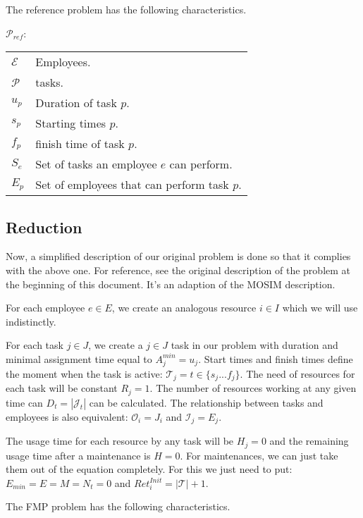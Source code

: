 \documentclass[a4paper,11pt]{article}
\begin{document}
    The reference problem has the following characteristics.

    $\mathcal{P}_{ref}$:

    \begin{tabular}{ll}
        $\mathcal{E}$       & Employees. \\
        $\mathcal{P}$       & tasks.  \\
        $u_p$     			&  Duration of task $p$. \\
        $s_p$     			&  Starting times $p$. \\
        $f_p$     			&  finish time of task $p$. \\
        $S_e$     &  Set of tasks an employee $e$ can perform. \\
        $E_p$ &  Set of employees that can perform task $p$. \\
    \end{tabular}

    \subsection{Reduction}

    Now, a simplified description of our original problem is done so that it complies with the above one. For reference, see the original description of the problem at the beginning of this document. It's an adaption of the MOSIM description.

    For each employee $e \in E$, we create an analogous resource $i \in I$ which we will use indistinctly. 

    For each task $j \in J$, we create a $j \in J$ task in our problem with duration and minimal assignment time equal to $A^{min}_j = u_j$. Start times and finish times define the moment when the task is active: $\mathcal{T}_j = t \in \{s_j ... f_j\}$. The need of resources for each task will be constant $R_{j} = 1$. The number of resources working at any given time can $D_t = |\mathcal{J}_t|$ can be calculated. The relationship between tasks and employees is also equivalent: $\mathcal{O}_i = J_i$ and $\mathcal{I}_j = E_j$.

    The usage time for each resource by any task will be $H_j = 0$ and the remaining usage time after a maintenance is $H = 0$.
    For maintenances, we can just take them out of the equation completely. For this we just need to put: $E_{min} = E = M = N_t = 0$ and $Ret^{Init}_{i} = |\mathcal{T}| + 1$.

    The FMP problem has the following characteristics.
\end{document}
